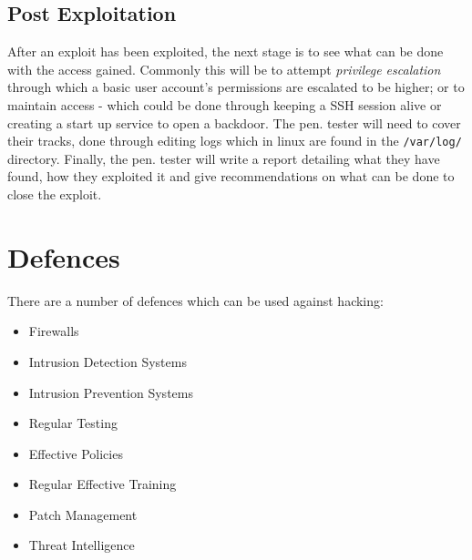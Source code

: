 \subsection{Post Exploitation}
After an exploit has been exploited, the next stage is to see what can be done with the access gained. Commonly this will be to attempt \textit{privilege escalation} through which a basic user account's permissions are escalated to be higher; or to maintain access - which could be done through keeping a SSH session alive or creating a start up service to open a backdoor. The pen. tester will need to cover their tracks, done through editing logs which in linux are found in the \verb|/var/log/| directory. Finally, the pen. tester will write a report detailing what they have found, how they exploited it and give recommendations on what can be done to close the exploit. 

\section{Defences}
There are a number of defences which can be used against hacking:
\begin{itemize}
    \item Firewalls
    \item Intrusion Detection Systems
    \item Intrusion Prevention Systems
    \item Regular Testing
    \item Effective Policies
    \item Regular Effective Training
    \item Patch Management
    \item Threat Intelligence
\end{itemize}